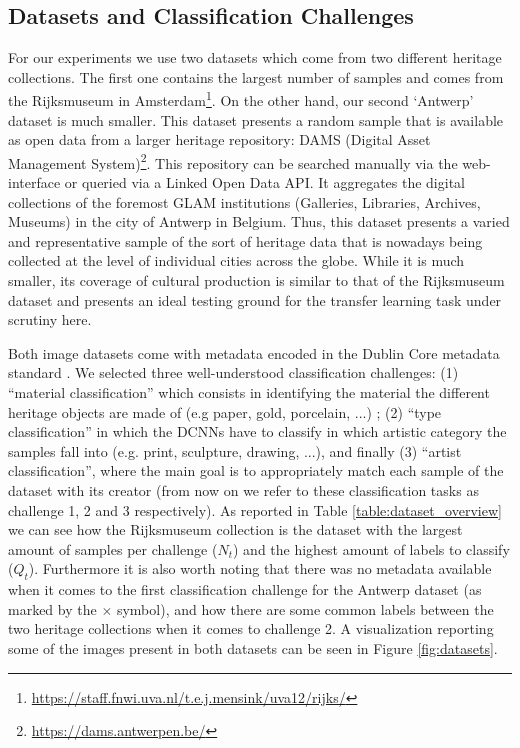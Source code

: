 \documentclass[runningheads]{llncs}
\begin{document}
\subsection{Datasets and Classification Challenges}
\label{subsec:datasets}

For our experiments we use two datasets which come from two different heritage collections. The first one contains the largest number of samples and comes from the Rijksmuseum in Amsterdam\footnote{\url{https://staff.fnwi.uva.nl/t.e.j.mensink/uva12/rijks/}}. On the other hand, our second `Antwerp' dataset is much smaller. This dataset presents a random sample that is available as open data from a larger heritage repository: DAMS (Digital Asset Management System)\footnote{\url{https://dams.antwerpen.be/}}. This repository can be searched manually via the web-interface or queried via a Linked Open Data API. It aggregates the digital collections of the foremost GLAM institutions  (Galleries, Libraries, Archives, Museums) in the city of Antwerp in Belgium. Thus, this dataset presents a varied and representative sample of the sort of heritage data that is nowadays being collected at the level of individual cities across the globe. While it is much smaller, its coverage of cultural production is similar to that of the Rijksmuseum dataset and presents an ideal testing ground for the transfer learning task under scrutiny here.

Both image datasets come with metadata encoded in the Dublin Core metadata standard \cite{weibel1998dublin}. We selected three well-understood classification challenges: (1) ``material classification'' which consists in identifying the material the different heritage objects are made of (e.g paper, gold, porcelain, ...) ;  (2) ``type classification'' in which the DCNNs have to classify in which artistic category the samples fall into (e.g. print, sculpture, drawing, ...), and finally (3) ``artist classification'', where the main goal is to appropriately match each sample of the dataset with its creator (from now on we refer to these classification tasks as challenge 1, 2 and 3 respectively). As reported in Table \ref{table:dataset_overview} we can see how the Rijksmuseum collection is the dataset with the largest amount of samples per challenge ($N_t$) and the highest amount of labels to classify ($Q_t$). Furthermore it is also worth noting that there was no metadata available when it comes to the first classification challenge for the Antwerp dataset (as marked by the $\times$ symbol), and how there are some common labels between the two heritage collections when it comes to challenge 2. A visualization reporting some of the images present in both datasets can be seen in Figure \ref{fig:datasets}.
\end{document}
